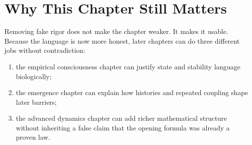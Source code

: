 \section{Why This Chapter Still Matters}

Removing fake rigor does not make the chapter weaker. It makes it usable.
Because the language is now more honest, later chapters can do three different
jobs without contradiction:
\begin{enumerate}[nosep]
  \item the empirical consciousness chapter can justify state and stability
        language biologically;
  \item the emergence chapter can explain how histories and repeated coupling
        shape later barriers;
  \item the advanced dynamics chapter can add richer mathematical structure
        without inheriting a false claim that the opening formula was already
        a proven law.
\end{enumerate}
